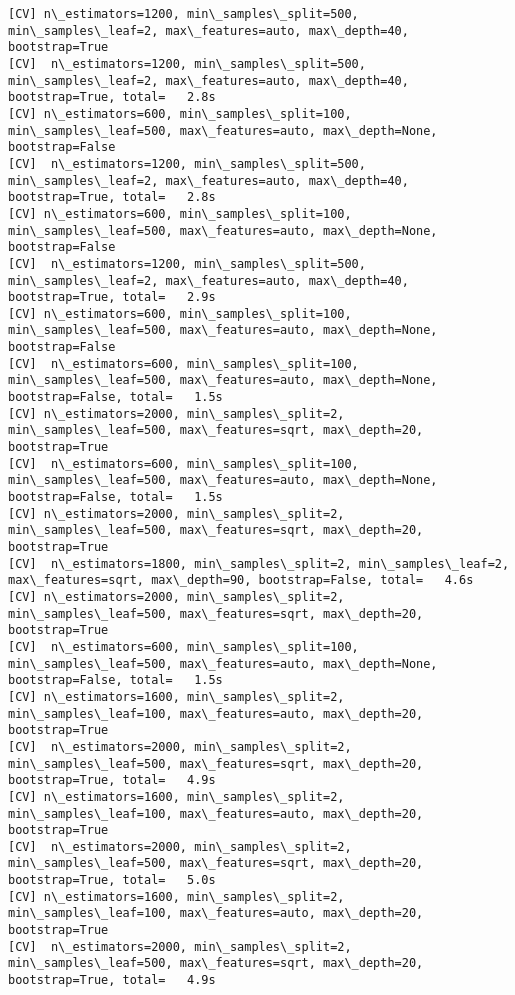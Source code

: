 \documentclass[11pt]{article}
\begin{document}
\begin{Verbatim}[commandchars=\\\{\}]
[CV] n\_estimators=1200, min\_samples\_split=500, min\_samples\_leaf=2, max\_features=auto, max\_depth=40, bootstrap=True 
[CV]  n\_estimators=1200, min\_samples\_split=500, min\_samples\_leaf=2, max\_features=auto, max\_depth=40, bootstrap=True, total=   2.8s
[CV] n\_estimators=600, min\_samples\_split=100, min\_samples\_leaf=500, max\_features=auto, max\_depth=None, bootstrap=False 
[CV]  n\_estimators=1200, min\_samples\_split=500, min\_samples\_leaf=2, max\_features=auto, max\_depth=40, bootstrap=True, total=   2.8s
[CV] n\_estimators=600, min\_samples\_split=100, min\_samples\_leaf=500, max\_features=auto, max\_depth=None, bootstrap=False 
[CV]  n\_estimators=1200, min\_samples\_split=500, min\_samples\_leaf=2, max\_features=auto, max\_depth=40, bootstrap=True, total=   2.9s
[CV] n\_estimators=600, min\_samples\_split=100, min\_samples\_leaf=500, max\_features=auto, max\_depth=None, bootstrap=False 
[CV]  n\_estimators=600, min\_samples\_split=100, min\_samples\_leaf=500, max\_features=auto, max\_depth=None, bootstrap=False, total=   1.5s
[CV] n\_estimators=2000, min\_samples\_split=2, min\_samples\_leaf=500, max\_features=sqrt, max\_depth=20, bootstrap=True 
[CV]  n\_estimators=600, min\_samples\_split=100, min\_samples\_leaf=500, max\_features=auto, max\_depth=None, bootstrap=False, total=   1.5s
[CV] n\_estimators=2000, min\_samples\_split=2, min\_samples\_leaf=500, max\_features=sqrt, max\_depth=20, bootstrap=True 
[CV]  n\_estimators=1800, min\_samples\_split=2, min\_samples\_leaf=2, max\_features=sqrt, max\_depth=90, bootstrap=False, total=   4.6s
[CV] n\_estimators=2000, min\_samples\_split=2, min\_samples\_leaf=500, max\_features=sqrt, max\_depth=20, bootstrap=True 
[CV]  n\_estimators=600, min\_samples\_split=100, min\_samples\_leaf=500, max\_features=auto, max\_depth=None, bootstrap=False, total=   1.5s
[CV] n\_estimators=1600, min\_samples\_split=2, min\_samples\_leaf=100, max\_features=auto, max\_depth=20, bootstrap=True 
[CV]  n\_estimators=2000, min\_samples\_split=2, min\_samples\_leaf=500, max\_features=sqrt, max\_depth=20, bootstrap=True, total=   4.9s
[CV] n\_estimators=1600, min\_samples\_split=2, min\_samples\_leaf=100, max\_features=auto, max\_depth=20, bootstrap=True 
[CV]  n\_estimators=2000, min\_samples\_split=2, min\_samples\_leaf=500, max\_features=sqrt, max\_depth=20, bootstrap=True, total=   5.0s
[CV] n\_estimators=1600, min\_samples\_split=2, min\_samples\_leaf=100, max\_features=auto, max\_depth=20, bootstrap=True 
[CV]  n\_estimators=2000, min\_samples\_split=2, min\_samples\_leaf=500, max\_features=sqrt, max\_depth=20, bootstrap=True, total=   4.9s

\end{Verbatim}
\end{document}
